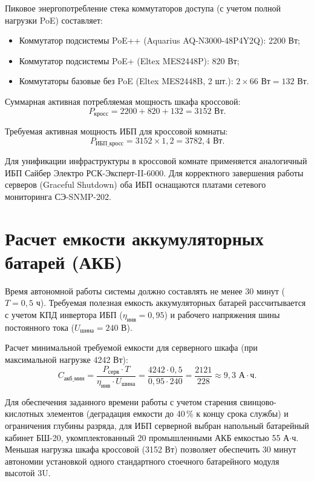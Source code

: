 \documentclass[a4paper,oneside,14pt]{extreport}
\begin{document}
Пиковое энергопотребление стека коммутаторов доступа (с учетом полной нагрузки PoE) составляет:
\begin{itemize}
    \item Коммутатор подсистемы PoE++ (Aquarius AQ-N3000-48P4Y2Q): 2200 Вт;
    \item Коммутатор подсистемы PoE+ (Eltex MES2448P): 820 Вт;
    \item Коммутаторы базовые без PoE (Eltex MES2448B, 2 шт.): $2 \times 66 \text{ Вт} = 132 \text{ Вт}$.
\end{itemize}

Суммарная активная потребляемая мощность шкафа кроссовой:
\begin{equation}
    P_{\text{кросс}} = 2200 + 820 + 132 = 3152 \text{ Вт}.
\end{equation}

Требуемая активная мощность ИБП для кроссовой комнаты:
\begin{equation}
    P_{\text{ИБП\_кросс}} = 3152 \times 1{,}2 = 3782{,}4 \text{ Вт}.
\end{equation}

Для унификации инфраструктуры в кроссовой комнате применяется аналогичный ИБП Сайбер Электро РСК-Эксперт-II-6000. Для корректного завершения работы серверов (Graceful Shutdown) оба ИБП оснащаются платами сетевого мониторинга СЭ-SNMP-202.

\section{Расчет емкости аккумуляторных батарей (АКБ)}

Время автономной работы системы должно составлять не менее 30 минут ($T = 0{,}5$ ч). Требуемая полезная емкость аккумуляторных батарей рассчитывается с учетом КПД инвертора ИБП ($\eta_{\text{инв}} = 0{,}95$) и рабочего напряжения шины постоянного тока ($U_{\text{шина}} = 240$ В).

Расчет минимальной требуемой емкости для серверного шкафа (при максимальной нагрузке 4242 Вт):
\begin{equation}
    C_{\text{акб\_мин}} = \frac{P_{\text{серв}} \cdot T}{\eta_{\text{инв}} \cdot U_{\text{шина}}} = \frac{4242 \cdot 0{,}5}{0{,}95 \cdot 240} = \frac{2121}{228} \approx 9{,}3 \text{ А}\cdot\text{ч}.
\end{equation}

Для обеспечения заданного времени работы с учетом старения свинцово-кислотных элементов (деградация емкости до 40\,\% к концу срока службы) и ограничения глубины разряда, для ИБП серверной выбран напольный батарейный кабинет БШ-20, укомплектованный 20 промышленными АКБ емкостью 55 А$\cdot$ч. Меньшая нагрузка шкафа кроссовой (3152 Вт) позволяет обеспечить 30 минут автономии установкой одного стандартного стоечного батарейного модуля высотой 3U.
\end{document}
